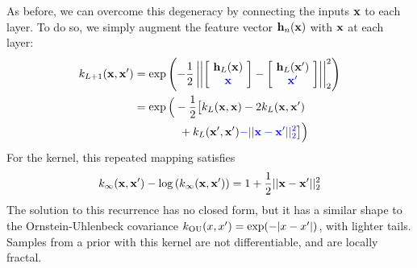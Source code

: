 \documentclass[twoside]{article}
\makeatletter
\newlength{\nonHumbleHeight}
\def\@humbleformat#1{{\settoheight{\nonHumbleHeight}{#1}\resizebox{!}{0.94\nonHumbleHeight}{#1}}}%
\newcommand\humble[1]{{\@humbleformat{#1}}}%
\newcommand{\gp}{{\humble{GP}}}
\newcommand{\hphi}{h}
\newcommand{\hPhi}{\vh}
\makeatother
\begin{document}
As before, we can overcome this degeneracy by %
connecting the inputs ${\bf{x}}$ to each layer.  To do so, we simply augment the feature vector $\hPhi_n(\vx)$ with ${\bf{x}}$ at each layer: 
%
\begin{align}
 k_{L+1}(\vx, \vx') %
& = \exp \left( -\frac{1}{2} \left|\left| \left[ \! \begin{array}{c} \hPhi_L(\vx) \\ {\color{blue} \vx} \end{array} \! \right]  - \left[ \! \begin{array}{c} \hPhi_L(\vx') \\ {\color{blue} \vx'} \end{array} \! \right] \right| \right|_2^2 \right) \nonumber \\
& = \exp \Big( -\frac{1}{2} \big[ k_{L}(\vx, \vx) - 2 k_{L}(\vx, \vx') \nonumber \\ 
& \qquad \qquad + k_{L}(\vx', \vx') {\color{blue} - || \vx - \vx' ||_2^2} \big] \Big)
\end{align}
%
For the \humble{SE} kernel, this repeated mapping satisfies
\begin{align}
k_\infty({\bf{x}}, {\bf{x}}') - \log \left( k_\infty({\bf{x}}, {\bf{x}}') \right) = 1 + \frac{1}{2} || {\bf{x}} - {\bf{x}}' ||_2^2
\end{align}
%
The solution to this recurrence has no closed form, but it has a similar shape to the Ornstein-Uhlenbeck covariance ${k_{\textnormal{OU}}(x,x') = \exp( -|x - x'| )}$, with lighter tails.
%
Samples from a \gp{} prior with this kernel are not differentiable, and are locally fractal.
\end{document}
